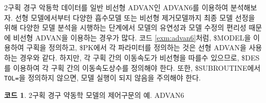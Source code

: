 \documentclass[
  10pt,
  krantz2,
  a4paper]{krantz}
\theoremstyle{definition}
\theoremstyle{definition}
\newtheorem{example}{코드}[chapter]
\theoremstyle{definition}
\theoremstyle{remark}
\begin{document}
2구획 경구 악둉학 데이터를 일반 비선형 ADVAN인 ADVAN6를 이용하여 분석해보자. 선형 모델에서부터 다양한 흡수모델 또는 비선형 제거모델까지 최종 모델 선정을 위해 다양한 모델 분석을 시행하는 단계에서 모델의 유연성과 모델 수정의 편리성 때문에 비선형 ADVAN을 이용하는 경우가 많다. 코드 \ref{exm:advan6}처럼, \$MODEL을 이용하여 구획을 정의하고, \$PK에서 각 파라미터를 정의하는 것은 선형 ADVAN을 사용하는 경우와 같다. 하지만, 각 구획 간의 이동속도가 비선형을 따를수 있으므로, \$DES를 이용하여 각 구획 간의 이동속도상수를 정의해야 한다. 또한, \$SUBROUTINE에서 \texttt{TOL=}을 정의하지 않으면, 모델 실행이 되지 않음을 주의해야 한다.

\begin{example}
\protect\hypertarget{exm:advan6}{}{\label{exm:advan6} }2구획 경구 약동학 모델의 제어구문의 예. ADVAN6
\end{example}
\end{document}
